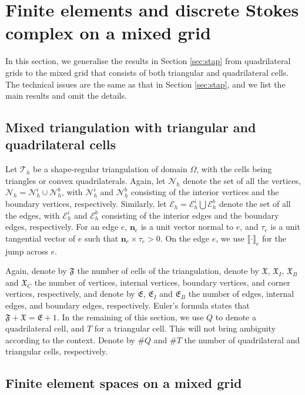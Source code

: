 \documentclass[12pt,showkeys]{amsart}
\begin{document}
\section{Finite elements and discrete Stokes complex on a mixed grid}
\label{sec:mixgrid}

In this section, we generalise the results in Section \ref{sec:stap} from quadrilateral grids to the mixed grid that consists  of both triangular and quadrilateral cells. The technical issues are the same as that in Section \ref{sec:stap}, and we list the main results and omit the details.

\subsection{Mixed triangulation with triangular and quadrilateral cells}

Let $\mathcal{T}_h$ be a shape-regular triangulation of domain $\Omega$, with the cells being triangles or convex quadrilaterals. Again, let $\mathcal{N}_h$ denote the set of all the vertices, $\mathcal{N}_h=\mathcal{N}_h^i\cup\mathcal{N}_h^b$, with $\mathcal{N}_h^i$ and $\mathcal{N}_h^b$ consisting of the interior vertices and the boundary vertices, respectively. Similarly, let $\mathcal{E}_h=\mathcal{E}_h^i\bigcup\mathcal{E}_h^b$ denote the set of all the edges, with $\mathcal{E}_h^i$ and $\mathcal{E}_h^b$ consisting of the interior edges and the boundary edges, respectively. For an edge $e$, $\mathbf{n}_e$ is a unit vector normal to $e$, and $\tau_e$ is a unit tangential vector of $e$ such that $\mathbf{n}_e\times\tau_e>0$. On the edge $e$, we use $\llbracket\cdot\rrbracket_e$ for the jump across $e$. 

Again, denote by $\mathfrak{F}$ the number of cells of the triangulation, denote by $\mathfrak{X}$, $\mathfrak{X}_I$, $\mathfrak{X}_B$ and $\mathfrak{X}_C$ the number of vertices, internal vertices, boundary vertices, and corner vertices, respectively, and denote by $\mathfrak{E}$, $\mathfrak{E}_I$ and $\mathfrak{E}_B$ the number of edges, internal edges, and boundary edges, respectively. Euler's formula states that $\mathfrak{F}+\mathfrak{X}=\mathfrak{E}+1$. In the remaining of this section, we use $Q$ to denote a quadrilateral cell, and $T$ for a triangular cell. This will not bring ambiguity according to the context. Denote by $\# Q$ and $\# T$ the number of quadrilateral and triangular cells, respectively.

\subsection{Finite element spaces on a mixed grid}
\end{document}

